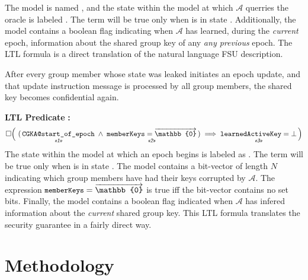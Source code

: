 \documentclass[runningheads]{llncs}
\newcommand{\Abrev}[1]{\gls{#1}}
\newcommand{\Zed}{\ensuremath{\mathbb{0}}\xspace}
\newcommand{\Adversary}{\ensuremath{\mathcal{A}}\xspace}
\begin{document}
The \Promela model is named , and the state within the model at which \Adversary querries the oracle   is labeled .
The term  will be true only when  is in state .
Additionally, the model contains a boolean flag  indicating when \Adversary has learned, during the \emph{current} epoch, information about the shared group key of any \emph{any previous} epoch.
The \Abrev{LTL} formula  is a direct translation of the natural language \Abrev{FSU} description.



\begin{definition}
After every group member whose state was leaked initiates an epoch update, and that update instruction message is processed by all group members, the shared key becomes confidential again.
\end{definition}%
\noindent\textbf{LTL Predicate} \textbf{:}%
{\small%
\begin{align*}
\Box \Big(~(\, \underset{\UnderNote{1}}{\texttt{CGKA@start\_of\_epoch}}\;\land\;\underset{\UnderNote{2}}{\texttt{memberKeys} = \overrightarrow{\Zed}} \,) \implies \underset{\UnderNote{3}}{\texttt{learnedActiveKey} = \bot} \, \Big)
\end{align*}
}
The state within the model at which an epoch begins is labeled as .
The term  will be true only when  is in state .
The model contains a bit-vector  of length \(N\) indicating which group members have had their keys corrupted by \Adversary.
The expression \(\TermLTL{memberKeys} = \overrightarrow{\Zed}  \) is true iff the bit-vector contains no set bits.
Finally, the model contains a boolean flag  indicated when \Adversary has infered information about the \emph{current} shared group key.
This  \Abrev{LTL} formula  translates the security guarantee in a fairly direct way.



\newcommand{\CompressedMonospace}[1]{%
{\textls{\textsc{#1}}}\xspace%
}%
\newcommand{\Code}[1]{\CompressedMonospace{#1}\xspace}

\section{Methodology}
\end{document}
